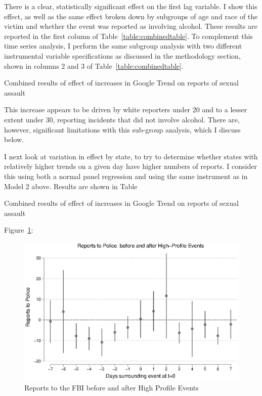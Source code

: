 \documentclass[AER,draftmode]{AEA}
\begin{document}
There is a clear, statistically significant effect on the first lag variable. I show this effect, as well as the same effect broken down by subgroups of age and race of the victim and whether the event was reported as involving alcohol. These results are reported in the first column of Table~\ref{table:combinedtable}. To complement this time series analysis, I perform the same subgroup analysis with two different instrumental variable specifications as discussed in the methodology section, shown in columns 2 and 3 of Table~\ref{table:combinedtable}.

\clearpage
\begin{table}[]
\caption{Combined results of effect of increases in Google Trend on reports of sexual assault} \label{table:combinedtable}

\end{table}

This increase appears to be driven by white reporters under 20 and to a lesser extent under 30, reporting incidents that did not involve alcohol. There are, however, significant limitations with this sub-group analysis, which I discuss below. 

I next look at variation in effect by state, to try to determine whether states with relatively higher trends on a given day have higher numbers of reports.  I consider this using both a normal panel regression and using the same instrument as in Model 2 above. Results are shown in Table 

\clearpage
\begin{table}[]
\caption{Combined results of effect of increases in Google Trend on reports of sexual assault} \label{table:combinedtable}

\end{table}


 Figure~\ref{figure:events_police}:

\begin{figure}
\includegraphics[width=\linewidth]{figures/events_police.eps}
\caption{Reports to the FBI before and after High Profile Events} \label{figure:events_police}
\end{figure}
\end{document}
